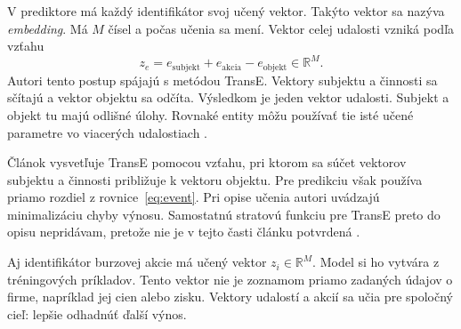 V prediktore má každý identifikátor svoj učený vektor. Takýto vektor sa nazýva \emph{embedding}. Má $M$ čísel a počas učenia sa mení. Vektor celej udalosti vzniká podľa vzťahu
\begin{equation}
z_e=e_{\mathrm{subjekt}}+e_{\mathrm{akcia}}-e_{\mathrm{objekt}}
\in\mathbb{R}^{M}.
\label{eq:event}
\end{equation}
Autori tento postup spájajú s metódou TransE. Vektory subjektu a činnosti sa sčítajú a vektor objektu sa odčíta. Výsledkom je jeden vektor udalosti. Subjekt a objekt tu majú odlišné úlohy. Rovnaké entity môžu používať tie isté učené parametre vo viacerých udalostiach .

Článok vysvetľuje TransE pomocou vzťahu, pri ktorom sa súčet vektorov subjektu a činnosti približuje k vektoru objektu. Pre predikciu však používa priamo rozdiel z rovnice~\eqref{eq:event}. Pri opise učenia autori uvádzajú minimalizáciu chyby výnosu. Samostatnú stratovú funkciu pre TransE preto do opisu nepridávam, pretože nie je v tejto časti článku potvrdená .

Aj identifikátor burzovej akcie má učený vektor $z_i\in\mathbb{R}^{M}$. Model si ho vytvára z tréningových príkladov. Tento vektor nie je zoznamom priamo zadaných údajov o firme, napríklad jej cien alebo zisku. Vektory udalostí a akcií sa učia pre spoločný cieľ: lepšie odhadnúť ďalší výnos.
